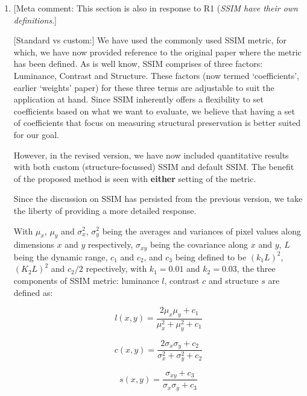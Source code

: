 \documentclass{article}
\begin{document}
\begin{enumerate}

  \item 

    [Meta comment: This section is also in response to R1 (\emph{SSIM
      have their own definitions}.]
    
    [Standard vs custom:] We have used the commonly used SSIM metric,
    for which, we have now provided reference to the original paper
    where the metric has been defined. As is well know, SSIM comprises
    of three factors: Luminance, Contrast and Structure. These factors
    (now termed `coefficients', earlier `weights' paper) for these
    three terms are adjustable to suit the application at hand.  Since
    SSIM inherently offers a flexibility to set coefficients based on
    what we want to evaluate, we believe that having a set of
    coefficients that focus on measuring structural preservation is
    better suited for our goal.
    
    However, in the revised version, we have now included quantitative
    results with both custom (structure-focussed) SSIM and default
    SSIM. The benefit of the proposed method is seen with
    \textbf{either} setting of the metric.

    Since the discussion on SSIM has persisted from the previous
    version, we take the liberty of providing a more detailed
    response. %

    With $\mu_x$, $\mu_y$ and $\sigma_x^2$, $\sigma_y^2$ being the
    averages and variances of pixel values along dimensions $x$ and
    $y$ respectively, $\sigma_{xy}$ being the covariance along $x$ and
    $y$, $L$ being the dynamic range, $c_1$ and $c_2$, and $c_3$ being
    defined to be $(k_1L)^2$, $(K_2L)^2$ and $c_2/2$ repectively, with
    $k_1=0.01$ and $k_2=0.03$, the three components of SSIM metric:
    luminance $l$, contrast $c$ and structure $s$ are defined as:

\begin{equation}
l(x,y) = \frac{2\mu_x\mu_y + c_1}{\mu_x^2 + \mu_y^2 + c_1}
\end{equation}

\begin{equation}
  c(x,y) = \frac{2\sigma_x\sigma_y + c_2}{\sigma_x^2 + \sigma_y^2 + c_2}
\end{equation}

\begin{equation}
  s(x,y) = \frac{\sigma_{xy} + c_3}{\sigma_x\sigma_y + c_3}
\end{equation}


\end{enumerate}
\end{document}
